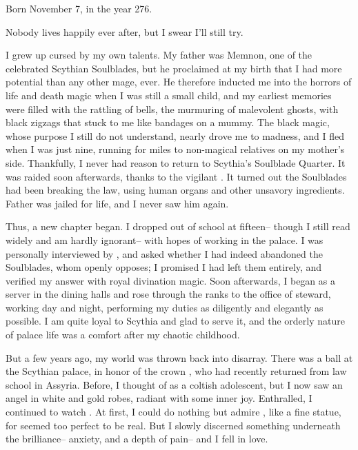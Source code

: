 \documentclass[char]{Kos}
\begin{document}
\name{\cButler{}}

Born November 7, in the year 276.

Nobody lives happily ever after, but I swear I'll still try.

I grew up cursed by my own talents. My father was Memnon, one of the celebrated Scythian Soulblades, but he proclaimed at my birth that I had more potential than any other mage, ever. He therefore inducted me into the horrors of life and death magic when I was still a small child, and my earliest memories were filled with the rattling of bells, the murmuring of malevolent ghosts, with black zigzags that stuck to me like bandages on a mummy. The black magic, whose purpose I still do not understand, nearly drove me to madness, and I fled when I was just nine, running for miles to non-magical relatives on my mother's side. Thankfully, I never had reason to return to Scythia's Soulblade Quarter. It was raided soon afterwards, thanks to the vigilant \cScythiaQueen{\Monarch} \cScythiaQueen{}. It turned out the Soulblades had been breaking the law, using human organs and other unsavory ingredients. Father was jailed for life, and I never saw him again.

Thus, a new chapter began. I dropped out of school at fifteen-- though I still read widely and am hardly ignorant-- with hopes of working in the palace. I was personally interviewed by\cScythiaQueen{\Monarch} \cScythiaQueen{}, and \cScythiaQueen{\they} asked whether I had indeed abandoned the Soulblades, whom \cScythiaQueen{\they} openly opposes; I promised I had left them entirely, and \cScythiaQueen{\they} verified my answer with royal divination magic. Soon afterwards, I began as a server in the dining halls and rose through the ranks to the office of steward, working day and night, performing my duties as diligently and elegantly as possible. I am quite loyal to Scythia and glad to serve it, and the orderly nature of palace life was a comfort after my chaotic childhood.

But a few years ago, my world was thrown back into disarray. There was a ball at the Scythian palace, in honor of the crown \cBride{\prince} \cBride{}, who had recently returned from law school in Assyria. Before, I thought of \cBride{\them} as a coltish adolescent, but I now saw an angel in white and gold robes, radiant with some inner joy. Enthralled, I continued to watch \cBride{\them}. At first, I could do nothing but admire \cBride{\them}, like a fine statue, for \cBride{\they} seemed too perfect to be real. But I slowly discerned something underneath the brilliance-- anxiety, and a depth of pain-- and I fell in love. 
\end{document}
